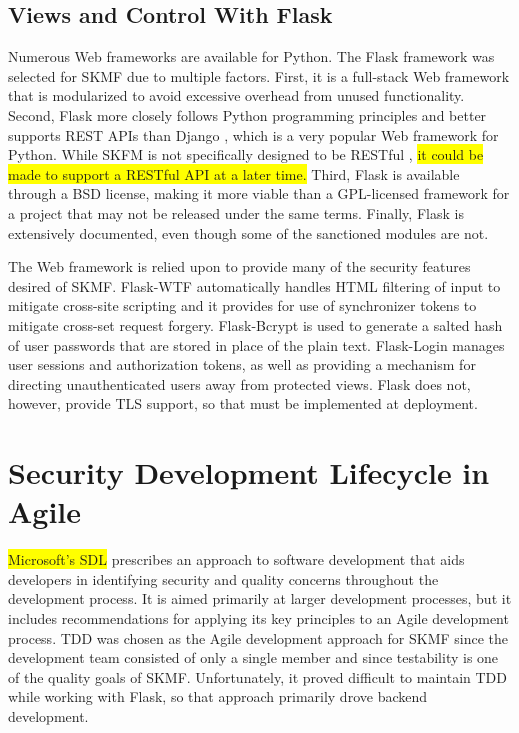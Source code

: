 \subsection{Views and Control With Flask}
\label{method:flask}

Numerous Web frameworks are available for Python. The Flask framework
\cite{flask}
was selected for SKMF due to multiple factors. First, it is a full-stack Web framework that is modularized to avoid excessive overhead from unused functionality. Second, Flask more closely follows Python programming principles and better supports REST APIs than Django
\cite{django},
which is a very popular Web framework for Python. While SKFM is not specifically designed to be RESTful
\cite{restful},
\colorbox{yellow}{it could be made to support a RESTful API at a later time.}
Third, Flask is available through a BSD license, making it more viable than a GPL-licensed framework for a project that may not be released under the same terms. Finally, Flask is extensively documented, even though some of the sanctioned modules are not.

The Web framework is relied upon to provide many of the security features desired of SKMF. Flask-WTF
\cite{flask-wtf}
automatically handles HTML filtering of input to mitigate cross-site scripting and it provides for use of synchronizer tokens to mitigate cross-set request forgery. Flask-Bcrypt
\cite{flask-bcrypt}
is used to generate a salted hash of user passwords that are stored in place of the plain text. Flask-Login
\cite{flask-login}
manages user sessions and authorization tokens, as well as providing a mechanism for directing unauthenticated users away from protected views. Flask does not, however, provide TLS support, so that must be implemented at deployment.


\section{Security Development Lifecycle in Agile}
\label{method:sdl}

\colorbox{yellow}{Microsoft's SDL}
\cite{secdevlifecycle}
prescribes an approach to software development that aids developers in identifying security and quality concerns throughout the development process. It is aimed primarily at larger development processes, but it includes recommendations for applying its key principles to an Agile development process. TDD was chosen as the Agile development approach for SKMF since the development team consisted of only a single member and since testability is one of the quality goals of SKMF. Unfortunately, it proved difficult to maintain TDD while working with Flask, so that approach primarily drove backend development.


